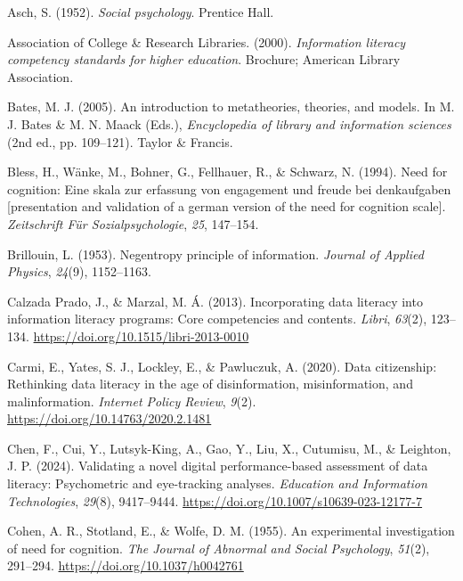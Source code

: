 \documentclass[
  12pt,
  a4paper,
  twoside]{article}
\newlength{\cslhangindent}
\newenvironment{CSLReferences}[2] %
 {\begin{list}{}{%
  \setlength{\itemindent}{0pt}
  \setlength{\leftmargin}{0pt}
  \setlength{\parsep}{0pt}
  \ifodd #1
   \setlength{\leftmargin}{\cslhangindent}
   \setlength{\itemindent}{-1\cslhangindent}
  \fi
  \setlength{\itemsep}{#2\baselineskip}}}
 {\end{list}}
\begin{document}
\label{refs}
\begin{CSLReferences}{1}{0}
Asch, S. (1952). \emph{Social psychology}. Prentice Hall.

Association of College \& Research Libraries. (2000). \emph{Information
literacy competency standards for higher education}. Brochure; American
Library Association.

Bates, M. J. (2005). An introduction to metatheories, theories, and
models. In M. J. Bates \& M. N. Maack (Eds.), \emph{Encyclopedia of
library and information sciences} (2nd ed., pp. 109--121). Taylor \&
Francis.

Bless, H., Wänke, M., Bohner, G., Fellhauer, R., \& Schwarz, N. (1994).
Need for cognition: Eine skala zur erfassung von engagement und freude
bei denkaufgaben {[}presentation and validation of a german version of
the need for cognition scale{]}. \emph{Zeitschrift Für
Sozialpsychologie}, \emph{25}, 147--154.

Brillouin, L. (1953). Negentropy principle of information. \emph{Journal
of Applied Physics}, \emph{24}(9), 1152--1163.

Calzada Prado, J., \& Marzal, M. Á. (2013). Incorporating data literacy
into information literacy programs: Core competencies and contents.
\emph{Libri}, \emph{63}(2), 123--134.
\url{https://doi.org/10.1515/libri-2013-0010}

Carmi, E., Yates, S. J., Lockley, E., \& Pawluczuk, A. (2020). Data
citizenship: Rethinking data literacy in the age of disinformation,
misinformation, and malinformation. \emph{Internet Policy Review},
\emph{9}(2). \url{https://doi.org/10.14763/2020.2.1481}

Chen, F., Cui, Y., Lutsyk-King, A., Gao, Y., Liu, X., Cutumisu, M., \&
Leighton, J. P. (2024). Validating a novel digital performance-based
assessment of data literacy: Psychometric and eye-tracking analyses.
\emph{Education and Information Technologies}, \emph{29}(8), 9417--9444.
\url{https://doi.org/10.1007/s10639-023-12177-7}

Cohen, A. R., Stotland, E., \& Wolfe, D. M. (1955). An experimental
investigation of need for cognition. \emph{The Journal of Abnormal and
Social Psychology}, \emph{51}(2), 291--294.
\url{https://doi.org/10.1037/h0042761}


\end{CSLReferences}
\end{document}
